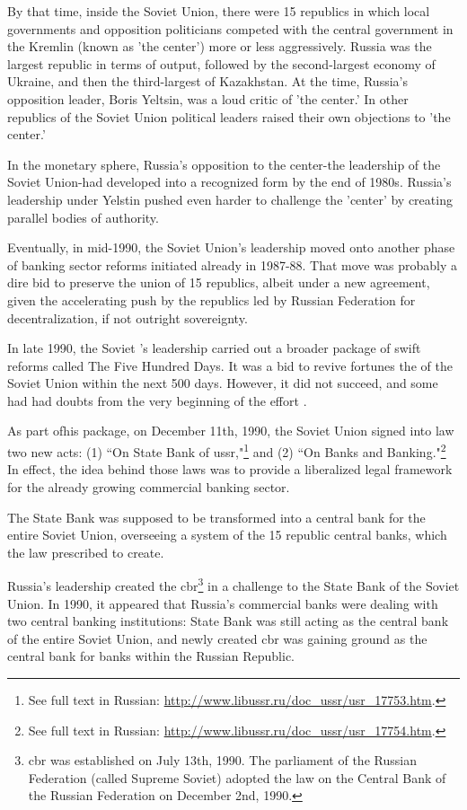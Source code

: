 By that time, inside the Soviet Union, there were 15 republics in which local governments and opposition politicians competed with the central government in the Kremlin (known as 'the center') more or less aggressively. Russia was the largest republic in terms of output, followed by the second-largest economy of Ukraine, and then the third-largest of Kazakhstan. At the time, Russia's opposition leader, Boris Yeltsin, was a loud critic of 'the center.' In other republics of the Soviet Union political leaders raised their own objections to 'the center.' 

In the monetary sphere, Russia's opposition to the center-the leadership of the Soviet Union-had developed into a recognized form by the end of 1980s. Russia's leadership under Yelstin pushed even harder to challenge the 'center' by creating parallel bodies of authority. 

Eventually, in mid-1990, the Soviet Union's leadership moved onto another phase of banking sector reforms initiated already in 1987-88. That move was probably a dire bid to preserve the union of 15 republics, albeit under a new agreement, given the accelerating push by the republics led by Russian Federation for decentralization, if not outright sovereignty. 

In late 1990, the Soviet 's leadership carried out a broader package of swift reforms called The Five Hundred Days. It was a bid to revive fortunes the of the Soviet Union within the next 500 days. However, it did not succeed, and some had had doubts from the very beginning of the effort \citep{gaidar1996}. 

As part ofhis package, on December 11th, 1990, the Soviet Union signed into law two new acts: (1) ``On State Bank of \ac{ussr},"\footnote{See full text in Russian: \url{http://www.libussr.ru/doc_ussr/usr_17753.htm}.}  and (2) ``On Banks and Banking."\footnote{See full text in Russian: \url{http://www.libussr.ru/doc_ussr/usr_17754.htm}.}  In effect, the idea behind those laws was to provide a liberalized legal framework for the already growing commercial banking sector. 

The State Bank was supposed to be transformed into a central bank for the entire Soviet Union, overseeing a system of the 15 republic central banks, which the law prescribed to create.

Russia's leadership created the \acf{cbr}\footnote{\acf{cbr} was established on July 13th, 1990. The parliament of the Russian Federation (called Supreme Soviet) adopted the law on the Central Bank of the Russian Federation on December 2nd, 1990.} in a challenge to the State Bank of the Soviet Union. In 1990, it appeared that Russia's commercial banks were dealing with two central banking institutions: State Bank was still acting as the central bank of the entire Soviet Union, and newly created \ac{cbr} was gaining ground as the central bank for banks within the Russian Republic. 

